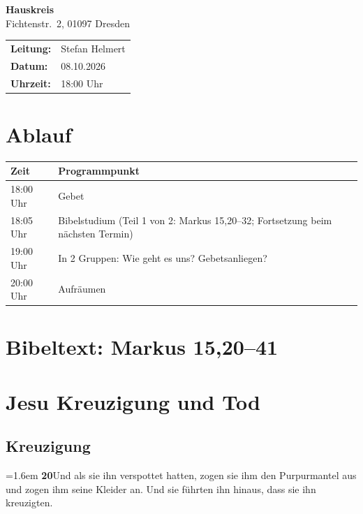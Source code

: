 \documentclass[12pt,a4paper]{article}
\newcommand{\vers}[2]{%
  \par\hangindent=1.6em\hangafter=1
  \textbf{#1}\enspace #2\par}
\begin{document}
\begin{center}
  {\LARGE\bfseries Hauskreis}\\[6pt]
  {\large Fichtenstr.~2, 01097 Dresden}\\[10pt]
  \begin{tabular}{ll}
    \textbf{Leitung:} & Stefan Helmert \\
    \textbf{Datum:}   & 08.10.2026 \\
    \textbf{Uhrzeit:} & 18:00 Uhr \\
  \end{tabular}
\end{center}

\vspace{1em}

\section*{Ablauf}

\begin{tabularx}{\textwidth}{@{}lX@{}}
  \toprule
  \textbf{Zeit} & \textbf{Programmpunkt} \\
  \midrule
  18:00 Uhr & Gebet \\
  18:05 Uhr & Bibelstudium (Teil 1 von 2: Markus 15,20--32; Fortsetzung beim nächsten Termin) \\
  19:00 Uhr & In 2 Gruppen: Wie geht es uns? Gebetsanliegen? \\
  20:00 Uhr & Aufräumen \\
  \bottomrule
\end{tabularx}

\vspace{1.5em}

\section*{Bibeltext: Markus 15,20--41}

\section*{Jesu Kreuzigung und Tod}

\subsection*{Kreuzigung}

\vers{20}{Und als sie ihn verspottet hatten, zogen sie ihm den Purpurmantel aus und zogen ihm seine Kleider an. Und sie führten ihn hinaus, dass sie ihn kreuzigten.}
\end{document}
